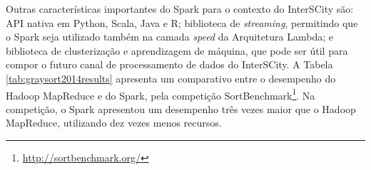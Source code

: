 \begin{table}[!htbp]
    \centering
    \caption[Resultados da Sort Benchmark 2014, categoria GraySort]{Resultados da Sort Benchmark 2014, categoria GraySort. Fonte: Databricks, 2014\footnotemark.}
    \label{tab:graysort2014results}
\end{table}

Outras características importantes do Spark para o contexto do
InterSCity são: API nativa em Python, Scala, Java e R; biblioteca de
\textit{streaming}, permitindo que o Spark seja utilizado também na camada
\textit{speed} da Arquitetura Lambda; e biblioteca de clusterização e
aprendizagem de máquina, que pode ser útil para compor o futuro canal de
processamento de dados do InterSCity. A Tabela \ref{tab:graysort2014results}
apresenta um comparativo entre o desempenho do Hadoop MapReduce e do Spark, pela
competição SortBenchmark\footnote{\url{http://sortbenchmark.org/}}. Na
competição, o Spark apresentou um desempenho três vezes maior que o Hadoop
MapReduce, utilizando dez vezes menos recursos.

